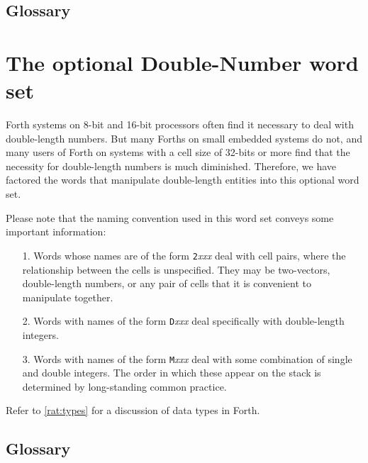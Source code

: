 \setcounter{subsection}{5}
\subsection{Glossary} %



\section{The optional Double-Number word set} %
\label{rat:double}

Forth systems on 8-bit and 16-bit processors often find it necessary
to deal with double-length numbers. But many Forths on small embedded
systems do not, and many users of Forth on systems with a cell size of
32-bits or more find that the necessity for double-length numbers is
much diminished. Therefore, we have factored the words that manipulate
double-length entities into this optional word set.

Please note that the naming convention used in this word set conveys
some important information:

\begin{enumerate}
\item[1.]
	Words whose names are of the form \texttt{2}\emph{xxx} deal
	with cell pairs, where the relationship between the cells is
	unspecified. They may be two-vectors, double-length numbers, or
	any pair of cells that it is convenient to manipulate together.

\item[2.]
	Words with names of the form \texttt{D}\emph{xxx} deal
	specifically with double-length integers.

\item[3.]
	Words with names of the form \texttt{M}\emph{xxx} deal with
	some combination of single and double integers. The order in
	which these appear on the stack is determined by long-standing
	common practice.
\end{enumerate}

Refer to \ref{rat:types} for a discussion of data types in Forth.

\setcounter{subsection}{5}
\subsection{Glossary} %



